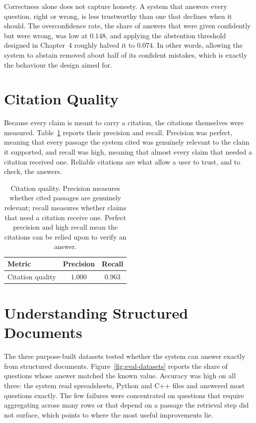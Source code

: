 Correctness alone does not capture honesty. A system that answers every question,
right or wrong, is less trustworthy than one that declines when it should. The
overconfidence rate, the share of answers that were given confidently but were
wrong, was low at $0.148$, and applying the abstention threshold designed in
Chapter~4 roughly halved it to $0.074$. In other words, allowing the system to
abstain removed about half of its confident mistakes, which is exactly the
behaviour the design aimed for.

\section{Citation Quality}

Because every claim is meant to carry a citation, the citations themselves were
measured. Table~\ref{tab:citation} reports their precision and recall. Precision
was perfect, meaning that every passage the system cited was genuinely relevant to
the claim it supported, and recall was high, meaning that almost every claim that
needed a citation received one. Reliable citations are what allow a user to trust,
and to check, the answers.

\begin{table}[H]
  \centering
  \caption{Citation quality. Precision measures whether cited passages are
  genuinely relevant; recall measures whether claims that need a citation receive
  one. Perfect precision and high recall mean the citations can be relied upon to
  verify an answer.}
  \label{tab:citation}
  \small
  \begin{tabularx}{0.7\textwidth}{@{}Xcc@{}}
    \toprule
    \textbf{Metric} & \textbf{Precision} & \textbf{Recall} \\
    \midrule
    Citation quality & $1.000$ & $0.963$ \\
    \bottomrule
  \end{tabularx}
\end{table}

\section{Understanding Structured Documents}

The three purpose-built datasets tested whether the system can answer exactly from
structured documents. Figure~\ref{fig:eval-datasets} reports the share of questions
whose answer matched the known value. Accuracy was high on all three: the system
read spreadsheets, Python and C++ files and answered most questions exactly. The
few failures were concentrated on questions that require aggregating across many
rows or that depend on a passage the retrieval step did not surface, which points
to where the most useful improvements lie.

